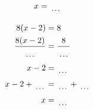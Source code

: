 \documentclass[12pt]{article}
\newcounter{minipagecount}
\begin{document}
\begin{multicols}{2}
\begin{minipage}[t]{0.45\textwidth}
\begin{align*}
        x &= \dotuline{\hspace{5mm}}\\
    \end{align*}
\end{minipage} %
\noindent{(\theminipagecount)}\hspace{0.1mm} %
\begin{minipage}[t]{0.45\textwidth} %
    \vspace{-26pt}  %
    \raggedright %
    \begin{align*} %
        8(x - 2) &= 8\\
        \frac{8(x-2)}{\dotuline{\hspace{5mm}}} &= \frac{8}{\dotuline{\hspace{5mm}}}\\
        x - 2 &= \dotuline{\hspace{5mm}}\\
        x - 2 + \dotuline{\hspace{5mm}} &= \dotuline{\hspace{5mm}} + \dotuline{\hspace{5mm}}\\
        x &= \dotuline{\hspace{5mm}}\\
    \end{align*}
\end{minipage} %
\noindent{(\theminipagecount)}\hspace{0.1mm} %
\begin{minipage}[t]{0.45\textwidth} %
    \vspace{-26pt}  %

\end{minipage}
\end{multicols}
\end{document}
